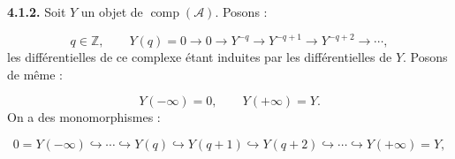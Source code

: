 \medskip\noindent\textbf{4.1.2.}\quad
Soit $Y$ un objet de $\operatorname{comp}(\mathcal A)$. Posons :

\begin{equation}
q\in\mathbb Z,\qquad
Y(q)=0\longrightarrow0\longrightarrow Y^{-q}\longrightarrow
Y^{-q+1}\longrightarrow Y^{-q+2}\longrightarrow\cdots,
\tag{4.1.2.1}
\end{equation}
les différentielles de ce complexe étant induites par les différentielles de
$Y$. Posons de même :

\begin{equation}
Y(-\infty)=0,\qquad Y(+\infty)=Y.
\tag{4.1.2.2}
\end{equation}
On a des monomorphismes :

\[
0=Y(-\infty)\hookrightarrow\cdots\hookrightarrow Y(q)
\hookrightarrow Y(q+1)\hookrightarrow Y(q+2)\hookrightarrow\cdots
\hookrightarrow Y(+\infty)=Y,
\]
\endgroup
